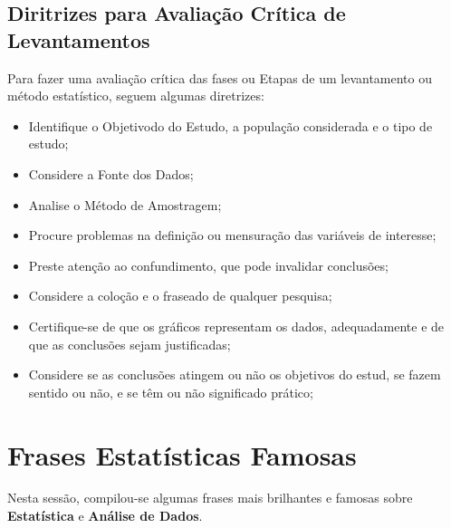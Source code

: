 \subsection{Diritrizes para Avaliação Crítica de Levantamentos}

\inic Para  fazer uma avaliação crítica das fases ou Etapas de um levantamento ou método estatístico, seguem algumas diretrizes:

\begin{itemize}
    \item Identifique o Objetivodo do Estudo, a população considerada e o tipo de estudo;
    \item Considere a Fonte dos Dados;
    \item Analise o Método de Amostragem;
    \item Procure problemas na definição ou mensuração das variáveis de interesse;
    \item Preste atenção ao confundimento, que pode invalidar conclusões;
    \item Considere a coloção e o fraseado de qualquer pesquisa;
    \item Certifique-se de que os gráficos representam os dados, adequadamente e de que as conclusões sejam justificadas;
    \item Considere se as conclusões atingem ou não os objetivos do estud, se fazem sentido ou não, e se têm ou não significado prático;
\end{itemize}







\newpage
\section{Frases Estatísticas Famosas}

Nesta sessão, compilou-se algumas frases mais brilhantes e famosas sobre \textbf{Estatística} e \textbf{Análise de Dados}.

